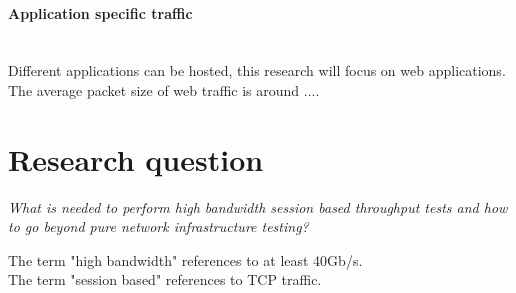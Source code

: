 \paragraph{Application specific traffic}\mbox{}\\
Different applications can be hosted, this research will focus on web applications. 
The average packet size of web traffic is around ....

\section{Research question}\label{sec:researchquestion}

\begin{center}
\textit{What is needed to perform high bandwidth session based throughput tests and how to go beyond pure network infrastructure testing?} \\
\end{center}
The term "high bandwidth" references to at least 40Gb/s. \\
The term "session based" references to TCP traffic. \\

